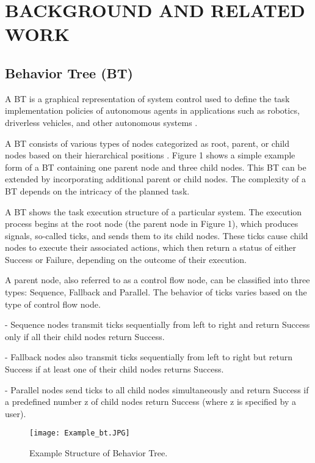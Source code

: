 \section{BACKGROUND AND RELATED WORK}
\subsection{Behavior Tree (BT)}
A BT is a graphical representation of system control used to define the task implementation policies of autonomous agents in applications such as robotics, driverless vehicles, and other autonomous systems \cite{c7}. 

A BT consists of various types of nodes categorized as root, parent, or child nodes based on their hierarchical positions \cite{c1,c2}. Figure 1 shows a simple example form of a BT containing one parent node and three child nodes. This BT can be extended by incorporating additional parent or child nodes. The complexity of a BT depends on the intricacy of the planned task. 

A BT shows the task execution structure of a particular system. The execution process begins at the root node (the parent node in Figure 1), which produces signals, so-called ticks, and sends them to its child nodes. These ticks cause child nodes to execute their associated actions, which then return a status of either Success or Failure, depending on the outcome of their execution.

A parent node, also referred to as a control flow node, can be classified into three types: Sequence, Fallback and Parallel. The behavior of ticks varies based on the type of control flow node.

-	Sequence nodes transmit ticks sequentially from left to right and return Success only if all their child nodes return Success.

-	Fallback nodes also transmit ticks sequentially from left to right but return Success if at least one of their child nodes returns Success.

-	Parallel nodes send ticks to all child nodes simultaneously and return Success if a predefined number z of child nodes return Success (where z is specified by a user).


\begin{figure}[t]
    \centering
    \texttt{[image: Example\_bt.JPG]} %
    \caption{Example Structure of Behavior Tree.}
    \label{fig:example}
\end{figure}


